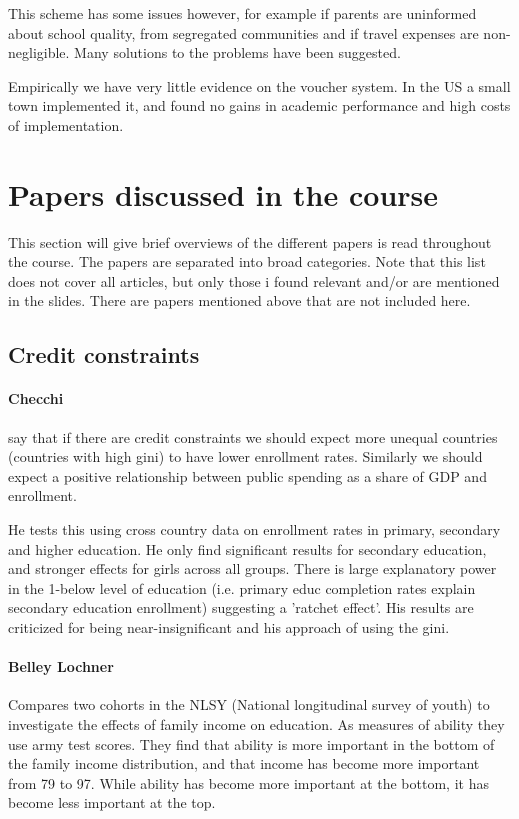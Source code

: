 \documentclass[12pt, a4paper]{article}
\begin{document}
\begin{multicols}{2}
This scheme has some issues however, for example if parents are uninformed about school quality, from segregated communities and if travel expenses are non-negligible. Many solutions to the problems have been suggested.

Empirically we have very little evidence on the voucher system. In the US a small town implemented it, and found no gains in academic performance and high costs of implementation.

\section{Papers discussed in the course}
This section will give brief overviews of the different papers is read throughout the course. The papers are separated into broad categories. Note that this list does not cover all articles, but only those i found relevant and/or are mentioned in the slides. There are papers mentioned above that are not included here.

\subsection{Credit constraints}
\paragraph{Checchi} say that if there are credit constraints we should expect more unequal countries (countries with high gini) to have lower enrollment rates. Similarly we should expect a positive relationship between public spending as  a share of GDP and enrollment.

He tests this using cross country data on enrollment rates in primary, secondary and higher education. He only find significant results for secondary education, and stronger effects for girls across all groups. There is large explanatory power in the 1-below level of education (i.e. primary educ completion rates explain secondary education enrollment) suggesting a 'ratchet effect'. His results are criticized for being near-insignificant and his approach of using the gini.


\paragraph{Belley Lochner} Compares two cohorts in the NLSY (National longitudinal survey of youth) to investigate the effects of family income on education. As measures of ability they use army test scores. They find that ability is more important in the bottom of the family income distribution, and that income has become more important from 79 to 97. While ability has become more important at the bottom, it has become less important at the top.


\end{multicols}
\end{document}
